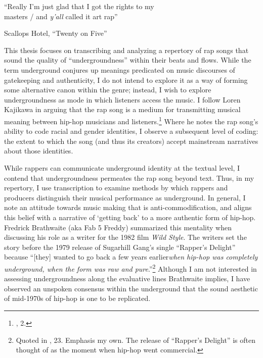 \epigraph{{``Really I'm just glad that I got the rights to my \\ masters / and \emph{y'all} called it art rap\textellipsis''}}{Scallops Hotel, ``Twenty on Five''}



This thesis focuses on transcribing and analyzing a repertory of rap songs that sound the quality of ``undergroundness'' within their beats and flows. While the term underground conjures up meanings predicated on music discourses of gatekeeping and authenticity, I do not intend to explore it as a way of forming some alternative canon within the genre; instead, I wish to explore undergroundness as mode in which listeners access the music. I follow Loren Kajikawa in arguing that the rap song is a medium for transmitting musical meaning between hip-hop musicians and listeners.\footnote{\cite{lorenkajikawaSoundingRaceRap2015}, 2.} Where he notes the rap song's ability to code racial and gender identities, I observe a subsequent level of coding: the extent to which the song (and thus its creators) accept mainstream narratives about those identities.

While rappers can communicate underground identity at the textual level, I contend that undergroundness permeates the rap song beyond text. Thus, in my repertory, I use transcription to examine methods by which rappers and producers distinguish their musical performance as underground. In general, I note an attitude towards music making that is anti-commodification, and aligns this belief with a narrative of `getting back' to a more authentic form of hip-hop. Fredrick Brathwaite (aka Fab 5 Freddy) summarized this mentality when discussing his role as a writer for the 1982 film \textit{Wild Style}. The writers set the story before the 1979 release of Sugarhill Gang's single ``Rapper's Delight'' because ``[they] wanted to go back a few years earlier\textellipsis \emph{when hip-hop was completely underground, when the form was raw and pure}.''\footnote{Quoted in \cite{justinawilliamsRhyminStealinMusical2013}, 23. Emphasis my own. The release of ``Rapper's Delight'' is often thought of as the moment when hip-hop went commercial.} Although I am not interested in assessing undergroundness along the evaluative lines Brathwaite implies, I have observed an unspoken consensus within the underground that the sound aesthetic of mid-1970s of hip-hop is one to be replicated.

